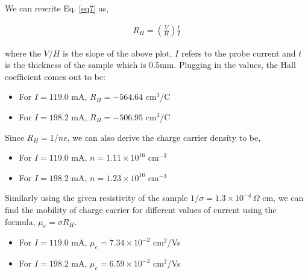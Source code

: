 We can rewrite Eq. \ref{eq7} as,

\begin{align} \label{eq9}
    R_H = \left(\frac{V}{H}\right)\frac{t}{I}
\end{align}

where the $V/H$ is the slope of the above plot, $I$ refers to the probe current and $t$ is the thickness of the sample which is 0.5mm. Plugging in the values, the Hall coefficient comes out to be:

\begin{itemize}
    \item For $I=119.0$ mA, $R_H = -564.64 $ cm$^3$/C
    \item For $I=198.2$ mA, $R_H = -506.95 $ cm$^3$/C
\end{itemize}

\noindent Since $R_H=1/ne$, we can also derive the charge carrier density to be,

\begin{itemize}
    \item For $I=119.0$ mA, $n = 1.11 \times 10^{16} $ cm$^{-3}$
    \item For $I=198.2$ mA, $n = 1.23 \times 10^{16} $ cm$^{-3}$
\end{itemize}

\noindent Similarly using the given resistivity of the sample $1/\sigma=1.3 \times 10^{-4}\,\Omega$ cm, we can find
the mobility of charge carrier for different values of current using the formula, $\mu_e=\sigma R_H$.

\begin{itemize}
    \item For $I=119.0$ mA, $\mu_e = 7.34 \times 10^{-2} $ cm$^{2}$/Vs
    \item For $I=198.2$ mA, $\mu_e = 6.59 \times 10^{-2} $ cm$^{2}$/Vs
\end{itemize} \vspace{-1em}